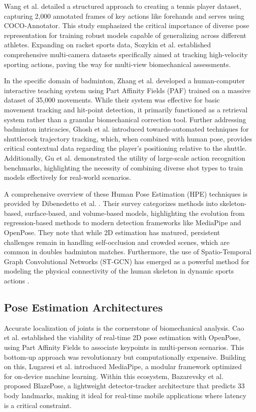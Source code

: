 \documentclass[pdflatex,sn-mathphys-num]{sn-jnl}%
\theoremstyle{thmstyleone}%
\theoremstyle{thmstyletwo}%
\theoremstyle{thmstylethree}%
\begin{document}
Wang et al. \cite{b4} detailed a structured approach to creating a tennis player dataset, capturing 2,000 annotated frames of key actions like forehands and serves using COCO-Annotator. This study emphasized the critical importance of diverse pose representation for training robust models capable of generalizing across different athletes. Expanding on racket sports data, Sozykin et al. \cite{b5} established comprehensive multi-camera datasets specifically aimed at tracking high-velocity sporting actions, paving the way for multi-view biomechanical assessments.

In the specific domain of badminton, Zhang et al. \cite{b6} developed a human-computer interactive teaching system using Part Affinity Fields (PAF) trained on a massive dataset of 35,000 movements. While their system was effective for basic movement tracking and hit-point detection, it primarily functioned as a retrieval system rather than a granular biomechanical correction tool. Further addressing badminton intricacies, Ghosh et al. \cite{b7} introduced towards-automated techniques for shuttlecock trajectory tracking, which, when combined with human pose, provides critical contextual data regarding the player's positioning relative to the shuttle. Additionally, Gu et al. \cite{b8} demonstrated the utility of large-scale action recognition benchmarks, highlighting the necessity of combining diverse shot types to train models effectively for real-world scenarios.

A comprehensive overview of these Human Pose Estimation (HPE) techniques is provided by Dibenedetto et al. \cite{b9}. Their survey categorizes methods into skeleton-based, surface-based, and volume-based models, highlighting the evolution from regression-based methods to modern detection frameworks like MediaPipe and OpenPose. They note that while 2D estimation has matured, persistent challenges remain in handling self-occlusion and crowded scenes, which are common in doubles badminton matches. Furthermore, the use of Spatio-Temporal Graph Convolutional Networks (ST-GCN) has emerged as a powerful method for modeling the physical connectivity of the human skeleton in dynamic sports actions \cite{b10}.

\subsection{Pose Estimation Architectures}
Accurate localization of joints is the cornerstone of biomechanical analysis. Cao et al. \cite{b11} established the viability of real-time 2D pose estimation with OpenPose, using Part Affinity Fields to associate keypoints in multi-person scenarios. This bottom-up approach was revolutionary but computationally expensive. Building on this, Lugaresi et al. \cite{b12} introduced MediaPipe, a modular framework optimized for on-device machine learning. Within this ecosystem, Bazarevsky et al. \cite{b13} proposed BlazePose, a lightweight detector-tracker architecture that predicts 33 body landmarks, making it ideal for real-time mobile applications where latency is a critical constraint.
\end{document}
